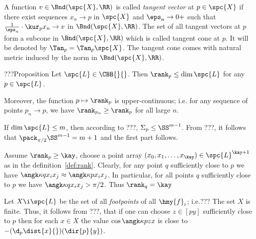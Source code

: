 A function $v\in\Bnd(\spc{X},\RR)$ is called \emph{tangent vector} at $p\in \spc{X}$ if there exist sequences 
$x_n\to p$ in $\spc{X}$ and $\eps_n\to 0+$ such that $\tfrac1{\eps_n}\cdot\kur_p x_n\to v$ in $\Bnd(\spc{X},\RR)$.
The set of all tangent vectors at $p$ form a subcone in $\Bnd(\spc{X},\RR)$ which is called tangent cone at $p$.
It will be denoted by $\Tan_p=\Tan_p\spc{X}$.
The tangent cone comes with natural metric induced by the norm in $\Bnd(\spc{X},\RR)$.























\begin{thm}{???Proposition}
Let $\spc{L}\in\CBB{}{}$. 
Then $\rank_p\le\dim\spc{L}$ for any $p\in \spc{L}$.

Moreover, the function $p\mapsto\rank_p$ is upper-continuous;
i.e. for any sequence of points $p_n\to p$, we have 
$\rank_{p_n}\ge\rank_p$
for all large $n$.
\end{thm}

If $\dim\spc{L}\le m$, then according to ???, $\Sigma_p\le\SS^{m-1}$.
From ???, it follows that $\pack_{\pi/2}\SS^{m-1}=m+1$ and the first part follows.

Assume $\rank_p\ge \kay$, choose a point array $(x_0,x_1,\dots,x_\kay)\in\spc{L}^{\kay+1}$ as in the definition~\ref{def:rank}.
Clearly, for any point $q$ sufficiently close to $p$
we have $\angk\kappa{q}{x_i}{x_j}\approx\angk\kappa{p}{x_i}{x_j}$.
In particular, for all points $q$ sufficiently close to $p$ we have $\angk\kappa{q}{x_i}{x_j}>\pi/2$.
Thus $\rank_q= \kay$
\qeds















Let $X\i \spc{L}$ be the set of all \emph{footpoints} of all $\hmy{f}_i$;
i.e.???
The set $X$ is finite.
Thus, it follows from ???, that if 
one can choose $z\in [py]$ sufficiently close to $p$ then 
for each $x\in X$ the value $\cos\angk\kappa p z x$ is close to $-(\d_p\dist{x}{})(\dir{p}{y})$.

